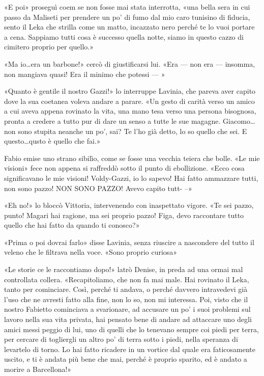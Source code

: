 «E poi» proseguì coem se non fosse mai stata interrotta, «una bella sera in cui passo da Maliseti per prendere un po' di fumo dal mio caro tunisino di fiducia, sento il Leka che strilla come un matto, incazzato nero perché te lo vuoi portare a cena. Sappiamo tutti cosa è successo quella notte, siamo in questo cazzo di cimitero proprio per quello.»

«Ma io\ldots era un barbone!» cercò di giustificarsi lui. «Era --- non era --- insomma, non mangiava quasi! Era il minimo che potessi --- »

«Quanto è gentile il nostro Gazzi!» lo interruppe Lavinia, che pareva aver capito dove la sua coetanea voleva andare a parare. «Un gesto di carità verso un amico a cui aveva appena rovinato la vita, una mano tesa verso una persona bisognosa, pronta a credere a tutto pur di dare un senso a tutte le sue magagne. Giacomo\ldots non sono stupita neanche un po', sai? Te l'ho già detto, lo so quello che sei. E questo\ldots qusto è quello che fai.»

Fabio emise uno strano sibilìo, come se fosse una vecchia teiera che bolle. «Le mie visioni» fece non appena si raffreddò sotto il punto di ebollizione. «Ecco cosa significavano le mie visioni! Voldy-Gazzi, io lo sapevo! Hai fatto ammazzare tutti, non sono pazzo! NON SONO PAZZO! Avevo capito tutt- --»

«Eh no!» lo bloccò Vittoria, intervenendo con inaspettato vigore. «Te sei pazzo, punto! Magari hai ragione, ma sei proprio pazzo! Figa, devo raccontare tutto quello che hai fatto da quando ti conosco?»

«Prima o poi dovrai farlo» disse Lavinia, senza riuscire a nascondere del tutto il veleno che le filtrava nella voce. «Sono proprio curiosa»

«Le storie ce le raccontiamo dopo!» latrò Denise, in preda ad una ormai mal controllata collera. «Recapitoliamo, che non fa mai male. Hai rovinato il Leka, tanto per cominciare. Così, perché ti andava, o perché davvero intravedevi già l'uso che ne avresti fatto alla fine, non lo so, non mi interessa. Poi, visto che il nostro Fabietto cominciava a svarionare, ad accusare un po' i suoi problemi sul lavoro nella sua vita privata, hai pensato bene di andare ad attaccare uno degli amici messi peggio di lui, uno di quelli che lo tenevano sempre coi piedi per terra, per cercare di togliergli un altro po' di terra sotto i piedi, nella speranza di levartelo di torno. Lo hai fatto ricadere in un vortice dal quale era faticosamente uscito, e ti è andata più bene che mai, perché è proprio sparito, ed è andato a morire a Barcellona!»

